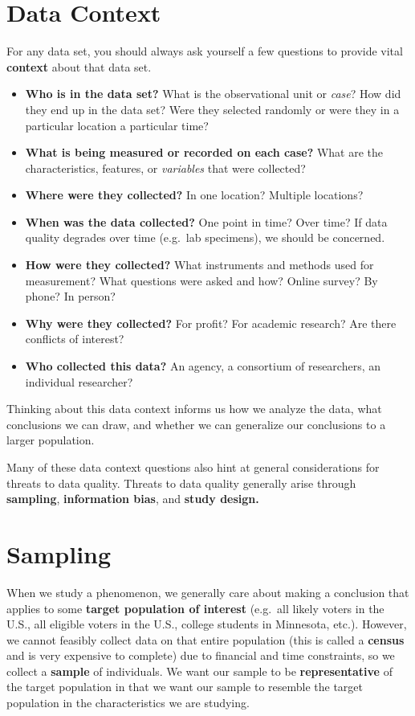 \documentclass[]{book}
\providecommand{\tightlist}{%
  \setlength{\itemsep}{0pt}\setlength{\parskip}{0pt}}
\begin{document}
\hypertarget{data-context}{%
\section{Data Context}\label{data-context}}

For any data set, you should always ask yourself a few questions to provide vital \textbf{context} about that data set.

\begin{itemize}
\tightlist
\item
  \textbf{Who is in the data set?} What is the observational unit or \emph{case}? How did they end up in the data set? Were they selected randomly or were they in a particular location a particular time?
\item
  \textbf{What is being measured or recorded on each case?} What are the characteristics, features, or \emph{variables} that were collected?
\item
  \textbf{Where were they collected?} In one location? Multiple locations?
\item
  \textbf{When was the data collected?} One point in time? Over time? If data quality degrades over time (e.g.~lab specimens), we should be concerned.
\item
  \textbf{How were they collected?} What instruments and methods used for measurement? What questions were asked and how? Online survey? By phone? In person?
\item
  \textbf{Why were they collected?} For profit? For academic research? Are there conflicts of interest?
\item
  \textbf{Who collected this data?} An agency, a consortium of researchers, an individual researcher?
\end{itemize}

Thinking about this data context informs us how we analyze the data, what conclusions we can draw, and whether we can generalize our conclusions to a larger population.

Many of these data context questions also hint at general considerations for threats to data quality. Threats to data quality generally arise through \textbf{sampling}, \textbf{information bias}, and \textbf{study design.}

\hypertarget{sampling}{%
\section{Sampling}\label{sampling}}

When we study a phenomenon, we generally care about making a conclusion that applies to some \textbf{target population of interest} (e.g.~all likely voters in the U.S., all eligible voters in the U.S., college students in Minnesota, etc.). However, we cannot feasibly collect data on that entire population (this is called a \textbf{census} and is very expensive to complete) due to financial and time constraints, so we collect a \textbf{sample} of individuals. We want our sample to be \textbf{representative} of the target population in that we want our sample to resemble the target population in the characteristics we are studying.
\end{document}
